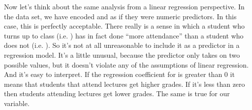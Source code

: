 Now let's think about the same analysis from a linear regression perspective. In the  data set, we have encoded  and  as if they were numeric predictors. In this case, this is perfectly acceptable. There really is a sense in which a student who turns up to class (i.e. ) has in fact done ``more attendance'' than a student who does not (i.e. ). So it's not at all unreasonable to include it as a predictor in a regression model. It's a little unusual, because the predictor only takes on two possible values, but it doesn't violate any of the assumptions of linear regression. And it's easy to interpret. If the regression coefficient for  is greater than 0 it means that students that attend lectures get higher grades. If it's less than zero then students attending lectures get lower grades. The same is true for our  variable.

